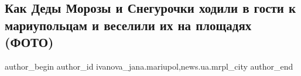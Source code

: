  
 
 
 
 
 
\subsection{Как Деды Морозы и Снегурочки ходили в гости к мариупольцам и веселили их на площадях (ФОТО)}
\label{sec:17_01_2018.stz.news.ua.mrpl_city.1.dedy_morozy_snegurochki}
 
\ifcmt
 author_begin
   author_id ivanova_jana.mariupol,news.ua.mrpl_city
 author_end
\fi
